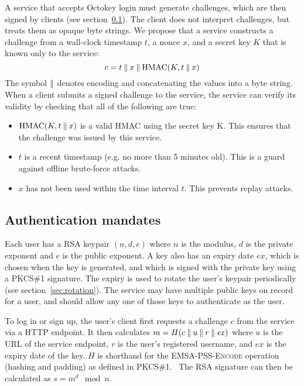 A service that accepts Octokey login must generate challenges, which are then signed by clients (see
section~\ref{sec:mandates}). The client does not interpret challenges, but treats them as opaque
byte strings. We propose that a service constructs a challenge from a wall-clock timestamp $t$, a
nonce $x$, and a secret key $K$ that is known only to the service:
$$c = t \mathbin{\|} x \mathbin{\|} \mathrm{HMAC}(K, t \mathbin{\|} x)$$
The symbol $\mathbin{\|}$ denotes encoding and concatenating the values into a byte string. When a client
submits a signed challenge to the service, the service can verify its validity by checking that all
of the following are true:
\begin{itemize}
\item $\mathrm{HMAC}(K, t \mathbin{\|} x)$ is a valid HMAC using the secret key K. This ensures that the
challenge was issued by this service.
\item $t$ is a recent timestamp (e.g. no more than 5 minutes old). This is a guard against offline
brute-force attacks.
\item $x$ has not been used within the time interval $t$. This prevents replay attacks.
\end{itemize}

\subsection{Authentication mandates}\label{sec:mandates}

Each user has a RSA keypair $(n, d, e)$ where $n$ is the modulus, $d$ is the private exponent and
$e$ is the public exponent. A key also has an expiry date $\mathit{ex}$, which is chosen when the
key is generated, and which is signed with the private key using a PKCS\#1 signature. The expiry is
used to rotate the user's keypair periodically (see section~\ref{sec:rotation}). The service may
have multiple public keys on record for a user, and should allow any one of those keys to authenticate
as the user.

To log in or sign up, the user's client first requests a challenge $c$ from the service via a HTTP
endpoint. It then calculates $m = H(c \mathbin{\|} u \mathbin{\|} r \mathbin{\|} \mathit{ex})$ where $u$ is the URL
of the service endpoint, $r$ is the user's registered username, and $\mathit{ex}$ is the expiry date
of the key. $H$ is shorthand for the \textsc{EMSA-PSS-Encode} operation (hashing and padding) as
defined in PKCS\#1.~\cite{PKCS1} The RSA signature can then be calculated as $s = m^d \mod n$.

